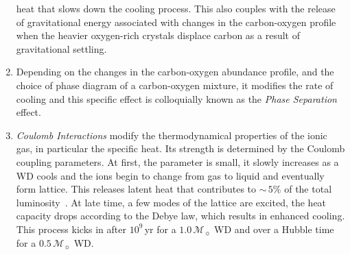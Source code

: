 \documentclass[fleqn,usenatbib]{rasti}
\newcommand{\msun}{\mathcal{M}_{\sun}}
\begin{document}
\begin{enumerate}
heat that slows down the cooling process. This also couples with the release
of gravitational energy associated with changes in the carbon-oxygen
profile~\citep{1997ApJ...486..413S} when the heavier oxygen-rich crystals
displace carbon as a result of gravitational settling.
    \item Depending on the
changes in the carbon-oxygen abundance profile, and the choice of phase
diagram of a carbon-oxygen mixture, it modifies the rate of cooling and this
specific effect is colloquially known as the \textit{Phase Separation}
effect.
    \item \textit{Coulomb Interactions} modify the thermodynamical
properties of the ionic gas, in particular the specific heat. Its strength is
determined by the Coulomb coupling parameters. At first, the parameter is
small, it slowly increases as a WD cools and the ions begin to change from
gas to liquid and eventually form lattice. This releases latent heat that
contributes to $\sim$\,$5\%$ of the total luminosity~\citep{1976A&A....51..383S}.
At late time, a few modes of the lattice are excited, the heat capacity drops
according to the Debye law, which results in enhanced cooling. This process
kicks in after $10^9$\,yr for a $1.0\,\msun$ WD and over a Hubble time for a
$0.5\,\msun$ WD.
\end{enumerate}
\end{document}
